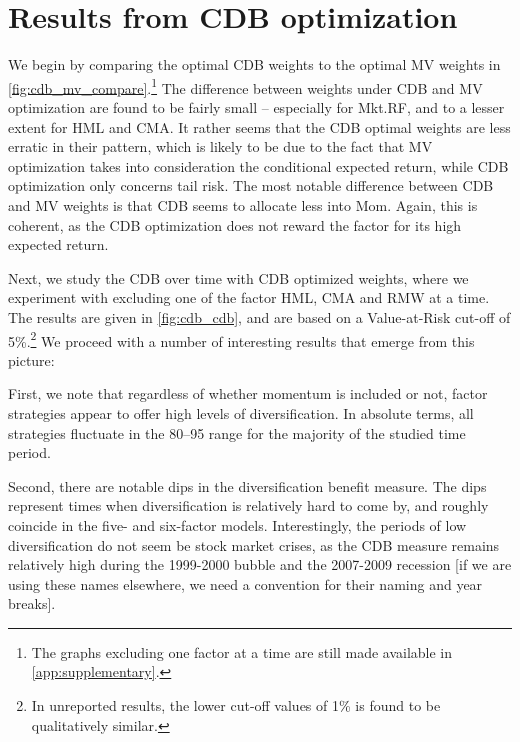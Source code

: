 
\section{Results from CDB optimization} %
\label{sec:cdb_optimization}


We begin by comparing the optimal CDB weights to the optimal MV weights in \autoref{fig:cdb_mv_compare}.\footnote{The graphs excluding one factor at a time are still made available in \autoref{app:supplementary}.} The difference between weights under CDB and MV optimization are found to be fairly small -- especially for Mkt.RF, and to a lesser extent for HML and CMA.  It rather seems that the CDB optimal weights are less erratic in their pattern, which is likely to be due to the fact that MV optimization takes into consideration the conditional expected return, while CDB optimization only concerns tail risk. The most notable difference between CDB and MV weights is that CDB seems to allocate less into Mom. Again, this is coherent, as the CDB optimization does not reward the factor for its high expected return. 

Next, we study the CDB over time with CDB optimized weights, where we experiment with excluding one of the factor HML, CMA and RMW at a time. The results are given in \autoref{fig:cdb_cdb}, and are based on a Value-at-Risk cut-off of 5\%.\footnote{In unreported results, the lower cut-off values of 1\% is found to be qualitatively similar.} We proceed with a number of interesting results that emerge from this picture:

First, we note that regardless of whether momentum is included or not, factor strategies appear to offer high levels of diversification. In absolute terms, all strategies fluctuate in the 80--95 range for the majority of the studied time period. 

Second, there are notable dips in the diversification benefit measure. The dips represent times when diversification is relatively hard to come by, and roughly coincide in the five- and six-factor models. Interestingly, the periods of low diversification do not seem be stock market crises, as the CDB measure remains relatively high during the 1999-2000 bubble and the 2007-2009 recession [if we are using these names elsewhere, we need a convention for their naming and year breaks].

